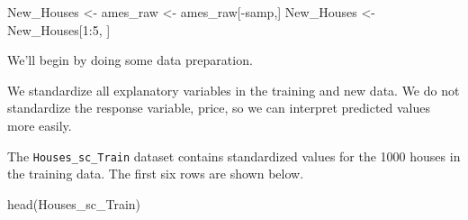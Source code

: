 \documentclass[
  letterpaper,
  DIV=11,
  numbers=noendperiod]{scrreprt}
\newenvironment{Shaded}{\begin{snugshade}}{\end{snugshade}}
\newcommand{\DecValTok}[1]{\textcolor[rgb]{0.68,0.00,0.00}{#1}}
\newcommand{\FunctionTok}[1]{\textcolor[rgb]{0.28,0.35,0.67}{#1}}
\newcommand{\NormalTok}[1]{\textcolor[rgb]{0.00,0.23,0.31}{#1}}
\newcommand{\OtherTok}[1]{\textcolor[rgb]{0.00,0.23,0.31}{#1}}
\newcommand{\SpecialCharTok}[1]{\textcolor[rgb]{0.37,0.37,0.37}{#1}}
\begin{document}
\begin{Shaded}
\begin{Highlighting}[]
\NormalTok{New\_Houses }\OtherTok{\textless{}{-}}\NormalTok{ ames\_raw }\OtherTok{\textless{}{-}}\NormalTok{ ames\_raw[}\SpecialCharTok{{-}}\NormalTok{samp,]}
\NormalTok{New\_Houses }\OtherTok{\textless{}{-}}\NormalTok{ New\_Houses[}\DecValTok{1}\SpecialCharTok{:}\DecValTok{5}\NormalTok{, ]}
\end{Highlighting}
\end{Shaded}

We'll begin by doing some data preparation.

We standardize all explanatory variables in the training and new data.
We do not standardize the response variable, price, so we can interpret
predicted values more easily.

\begin{Shaded}
\end{Shaded}

The \texttt{Houses\_sc\_Train} dataset contains standardized values for
the 1000 houses in the training data. The first six rows are shown
below.

\begin{Shaded}
\begin{Highlighting}[]
\FunctionTok{head}\NormalTok{(Houses\_sc\_Train)}
\end{Highlighting}
\end{Shaded}
\end{document}
